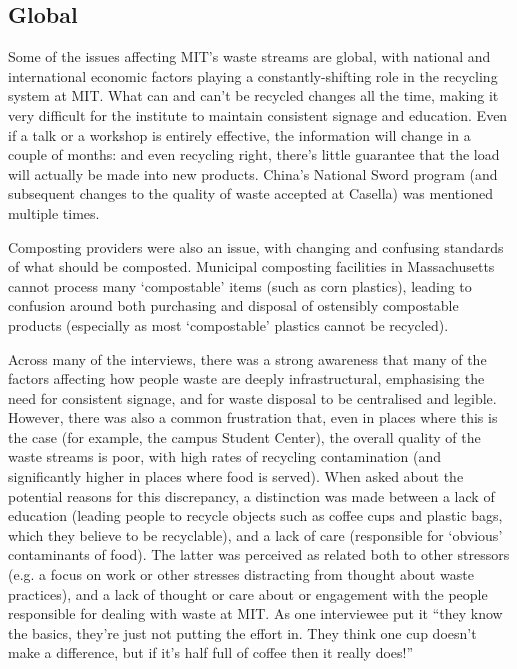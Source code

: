 \documentclass[nofonts,nols,justified,nobib]{tufte-book}
\begin{document}
\subsection*{Global}

Some of the issues affecting MIT's waste streams are global, with national and international economic factors playing a constantly-shifting role in the recycling system at MIT. What can and can't be recycled changes all the time, making it very difficult for the institute to maintain consistent signage and education. Even if a talk or a workshop is entirely effective, the information will change in a couple of months: and even recycling right, there's little guarantee that the load will actually be made into new products. China's National Sword program (and subsequent changes to the quality of waste accepted at Casella) was mentioned multiple times.

Composting providers were also an issue, with changing and confusing standards of what should be composted. Municipal composting facilities in Massachusetts cannot process many `compostable' items (such as corn plastics), leading to confusion around both purchasing and disposal of ostensibly compostable products (especially as most `compostable' plastics cannot be recycled).

Across many of the interviews, there was a strong awareness that many of the factors affecting how people waste are deeply infrastructural, emphasising the need for consistent signage, and for waste disposal to be centralised and legible. However, there was also a common frustration that, even in places where this is the case (for example, the campus Student Center), the overall quality of the waste streams is poor, with high rates of recycling contamination (and significantly higher in places where food is served). When asked about the potential reasons for this discrepancy, a distinction was made between a lack of education (leading people to recycle objects such as coffee cups and plastic bags, which they believe to be recyclable), and a lack of care (responsible for `obvious' contaminants of food). The latter was perceived as related both to other stressors (e.g. a focus on work or other stresses distracting from thought about waste practices), and a lack of thought or care about or engagement with the people responsible for dealing with waste at MIT. As one interviewee put it ``they know the basics, they're just not putting the effort in. They think one cup doesn't make a difference, but if it's half full of coffee then it really does!''
\end{document}
